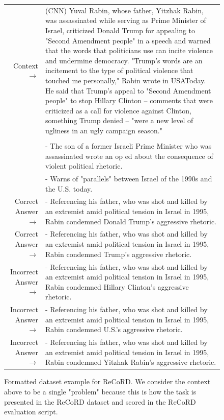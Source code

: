 \documentclass{article}
\begin{document}
\begin{figure} { \tt \footnotesize \begin{tabularx}{\linewidth}{r X} 
\toprule 
Context $\to$ & (CNN) Yuval Rabin, whose father, Yitzhak Rabin, was assassinated while serving as Prime Minister of Israel, criticized Donald Trump for appealing to "Second Amendment people" in a speech and warned that the words that politicians use can incite violence and undermine democracy. "Trump's words are an incitement to the type of political violence that touched me personally," Rabin wrote in USAToday. He said that Trump's appeal to "Second Amendment people" to stop Hillary Clinton -- comments that were criticized as a call for violence against Clinton, something Trump denied -- "were a new level of ugliness in an ugly campaign season." \\
& \\
&   - The son of a former Israeli Prime Minister who was assassinated wrote an op ed about the consequence of violent political rhetoric. \\
&   - Warns of "parallels" between Israel of the 1990s and the U.S. today. \\
\midrule 
 Correct Answer $\to$ & - Referencing his father, who was shot and killed by an extremist amid political tension in Israel in 1995, Rabin condemned Donald Trump's aggressive rhetoric. \\ 
 
 Correct Answer $\to$ & - Referencing his father, who was shot and killed by an extremist amid political tension in Israel in 1995, Rabin condemned Trump's aggressive rhetoric. \\ 
 
 Incorrect Answer $\to$ & - Referencing his father, who was shot and killed by an extremist amid political tension in Israel in 1995, Rabin condemned Hillary Clinton's aggressive rhetoric. \\
  Incorrect Answer $\to$ & - Referencing his father, who was shot and killed by an extremist amid political tension in Israel in 1995, Rabin condemned U.S.'s aggressive rhetoric. \\
 Incorrect Answer $\to$ & - Referencing his father, who was shot and killed by an extremist amid political tension in Israel in 1995, Rabin condemned Yitzhak Rabin's aggressive rhetoric. \\ 
 \bottomrule \end{tabularx} }   

 \caption{Formatted dataset example for ReCoRD. We consider the context above to be a single "problem" because this is how the task is presented in the ReCoRD dataset and scored in the ReCoRD evaluation script.}

\label{eval:ReCoRD}  \end{figure}
\end{document}
